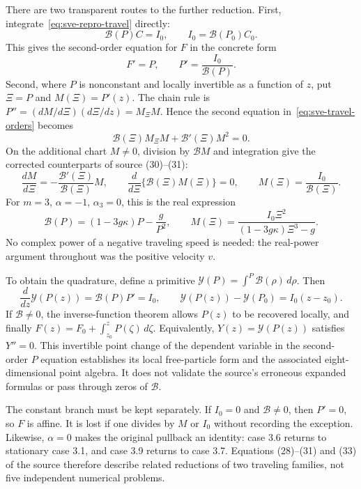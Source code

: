 There are two transparent routes to the further reduction. First,
integrate~\eqref{eq:sve-repro-travel} directly:
\[
 \mathcal B(P)C=I_0,\qquad I_0=\mathcal B(P_0)C_0.
\]
This gives the second-order equation for $F$ in the concrete form
\begin{equation}
 F'=P,\qquad P'=\frac{I_0}{\mathcal B(P)}.
 \label{eq:sve-travel-two-state}
\end{equation}
Second, where $P$ is nonconstant and locally invertible as a function of
$z$, put $\Xi=P$ and $M(\Xi)=P'(z)$. The chain rule is
$P''=(dM/d\Xi)(d\Xi/dz)=M_\Xi M$. Hence the second equation
in~\eqref{eq:sve-travel-orders} becomes
\[
 \mathcal B(\Xi)M_\Xi M+\mathcal B'(\Xi)M^2=0.
\]
On the additional chart $M\ne0$, division by $\mathcal B M$ and integration give
the corrected counterparts of source (30)--(31):
\begin{equation}
 \frac{dM}{d\Xi}=-\frac{\mathcal B'(\Xi)}{\mathcal B(\Xi)}M,
 \qquad \frac{d}{d\Xi}\{\mathcal B(\Xi)M(\Xi)\}=0,
 \qquad M(\Xi)=\frac{I_0}{\mathcal B(\Xi)}.
 \label{eq:sve-travel-further}
\end{equation}
For $m=3$, $\alpha=-1$, $\alpha_3=0$, this is the real expression
\[
 \mathcal B(P)=(1-3g\kappa)P-\frac g{P^2},\qquad
 M(\Xi)=\frac{I_0\Xi^2}{(1-3g\kappa)\Xi^3-g}.
\]
No complex power of a negative traveling speed is needed: the real-power
argument throughout was the positive velocity $v$.

To obtain the quadrature, define a primitive
$\mathcal Y(P)=\int^P \mathcal B(\rho)\,d\rho$. Then
\[
 \frac{d}{dz}\mathcal Y(P(z))=\mathcal B(P)P'=I_0,\qquad
 \mathcal Y(P(z))-\mathcal Y(P_0)=I_0(z-z_0).
\]
If $\mathcal B\ne0$, the inverse-function theorem allows $P(z)$ to be recovered
locally, and finally $F(z)=F_0+\int_{z_0}^zP(\zeta)\,d\zeta$.
Equivalently, $Y(z)=\mathcal Y(P(z))$ satisfies $Y''=0$.
This invertible point change of the dependent variable in the
second-order $P$ equation establishes its local free-particle form and
the associated eight-dimensional point algebra. It does not validate the
source's erroneous expanded formulas or pass through zeros of $\mathcal B$.

The constant branch must be kept separately. If $I_0=0$ and $\mathcal B\ne0$,
then $P'=0$, so $F$ is affine. It is lost if one divides by $M$ or $I_0$
without recording the exception. Likewise, $\alpha=0$ makes the
original pullback an identity: case 3.6 returns to stationary case 3.1,
and case 3.9 returns to case 3.7. Equations (28)--(31) and (33) of the
source therefore describe related reductions of two traveling families,
not five independent numerical problems.


